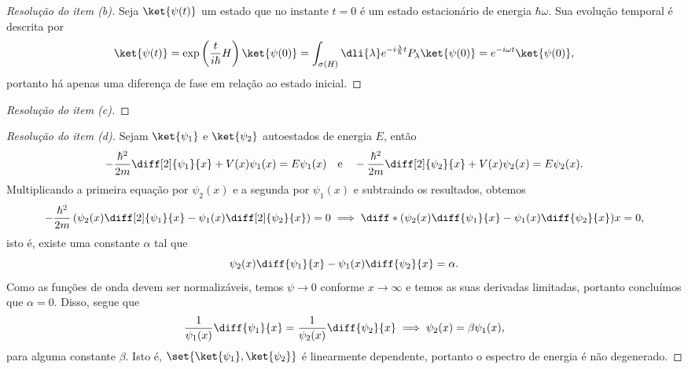 \begin{proof}[Resolução do item (b)]
    Seja \(\ket{\psi(t)}\) um estado que no instante \(t=0\) é um estado estacionário de energia \(\hbar \omega\). Sua evolução temporal é descrita por
    \begin{equation*}
        \ket{\psi(t)} = \exp\left(\frac{t}{i\hbar}H\right)\ket{\psi(0)} = \int_{\sigma(H)} \dli{\lambda} e^{-i\frac{\lambda}{\hbar} t}P_{\lambda} \ket{\psi(0)} = e^{-i\omega t} \ket{\psi(0)},
    \end{equation*}
    portanto há apenas uma diferença de fase em relação ao estado inicial.
\end{proof}

\begin{proof}[Resolução do item (c)]

\end{proof}

\begin{proof}[Resolução do item (d)]
    Sejam \(\ket{\psi_1}\) e \(\ket{\psi_2}\) autoestados de energia \(E\), então
    \begin{equation*}
        -\frac{\hbar^2}{2m}\diff[2]{\psi_1}{x} + V(x)\psi_1(x) = E\psi_1(x) \quad\text{e}\quad
        -\frac{\hbar^2}{2m}\diff[2]{\psi_2}{x} + V(x)\psi_2(x) = E\psi_2(x).
    \end{equation*}
    Multiplicando a primeira equação por \(\psi_2(x)\) e a segunda por \(\psi_1(x)\) e subtraindo os resultados, obtemos
    \begin{equation*}
        -\frac{\hbar^2}{2m} \left(\psi_2(x) \diff[2]{\psi_1}{x} - \psi_1(x) \diff[2]{\psi_2}{x}\right) = 0 \implies \diff*{\left(\psi_2(x)\diff{\psi_1}{x}-\psi_1(x) \diff{\psi_2}{x}\right)}{x} = 0,
    \end{equation*}
    isto é, existe uma constante \(\alpha\) tal que
    \begin{equation*}
        \psi_2(x) \diff{\psi_1}{x} - \psi_1(x) \diff{\psi_2}{x} = \alpha.
    \end{equation*}
    Como as funções de onda devem ser normalizáveis, temos \(\psi \to 0\) conforme \(x \to \infty\) e temos as suas derivadas limitadas, portanto concluímos que \(\alpha = 0\). Disso, segue que
    \begin{equation*}
        \frac{1}{\psi_1(x)}\diff{\psi_1}{x} = \frac{1}{\psi_2(x)}\diff{\psi_2}{x} \implies \psi_2(x) = \beta \psi_1(x),
    \end{equation*}
    para alguma constante \(\beta\). Isto é, \(\set{\ket{\psi_1},\ket{\psi_2}}\) é linearmente dependente, portanto o espectro de energia é não degenerado.
\end{proof}

